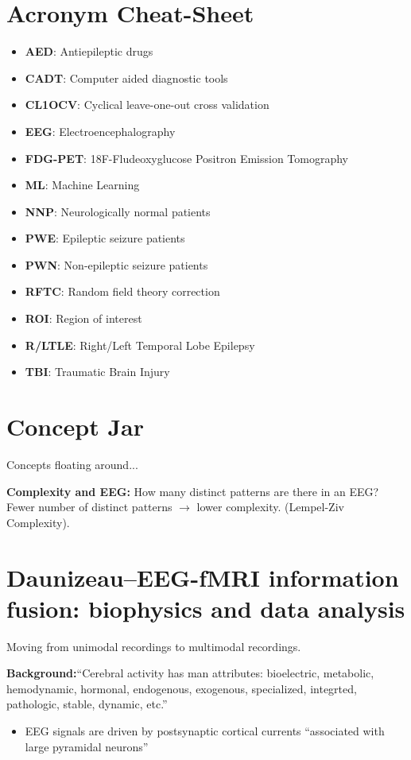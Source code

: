 \documentclass{article}
\begin{document}
\section{Acronym Cheat-Sheet}
\begin{itemize}
\item \textbf{AED}: Antiepileptic drugs
\item \textbf{CADT}: Computer aided diagnostic tools
\item \textbf{CL1OCV}: Cyclical leave-one-out cross validation
\item \textbf{EEG}: Electroencephalography
\item \textbf{FDG-PET}: 18F-Fludeoxyglucose Positron Emission Tomography
\item \textbf{ML}: Machine Learning
\item \textbf{NNP}: Neurologically normal patients
\item \textbf{PWE}: Epileptic seizure patients
\item \textbf{PWN}: Non-epileptic seizure patients
\item \textbf{RFTC}: Random field theory correction
\item \textbf{ROI}: Region of interest
\item \textbf{R/LTLE}: Right/Left Temporal Lobe Epilepsy
\item \textbf{TBI}: Traumatic Brain Injury

\end{itemize}

\section{Concept Jar}
Concepts floating around...

\textbf{Complexity and EEG:} How many distinct patterns are there in an EEG?
Fewer number of distinct patterns \ensuremath{\rightarrow} lower complexity.
(Lempel-Ziv Complexity).

\section{Daunizeau--EEG-fMRI information fusion: biophysics and data analysis}
Moving from unimodal recordings to multimodal recordings. 

\textbf{Background:}``Cerebral activity has man attributes: bioelectric,
metabolic, hemodynamic, hormonal, endogenous, exogenous, specialized, integrted,
pathologic, stable, dynamic, etc.'' 

\begin{itemize}
\item EEG signals are driven by postsynaptic cortical currents ``associated with
large pyramidal neurons''
\end{itemize}
\end{document}
